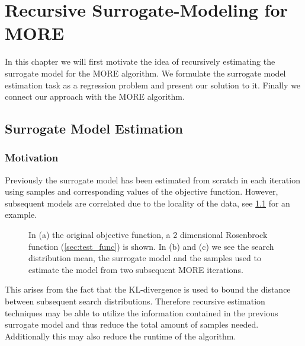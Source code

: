 
\chapter{Recursive Surrogate-Modeling for MORE}
In this chapter we will first motivate the idea of recursively
estimating the surrogate model for the MORE algorithm.
We formulate the surrogate model estimation task
as a regression problem and present our solution to it.
Finally we connect our approach with the MORE algorithm.

\section{Surrogate Model Estimation}
\label{sec:surrogate}
\subsection{Motivation}
Previously the surrogate model has been estimated from scratch in each
iteration using samples and corresponding
values of the objective function. 
However, subsequent models are correlated
due to the locality of the data, see \cref{fig:sur_model} for an example.
\begin{figure}[t]
  \centering
  \caption{\small
    In (a) the original objective function,
    a 2 dimensional Rosenbrock function (\cref{sec:test_func}) is shown.
    In (b) and (c) we see the search distribution mean,
    the surrogate model and the samples used to estimate
    the model from two subsequent MORE iterations.}
 \label{fig:sur_model}
\end{figure}
This arises from the fact that the KL-divergence is
used to bound the distance between
subsequent search distributions. Therefore recursive estimation
techniques may be able to utilize the information contained in the previous
surrogate model and thus reduce the total amount of samples needed.
Additionally this may also reduce the runtime of the algorithm.

